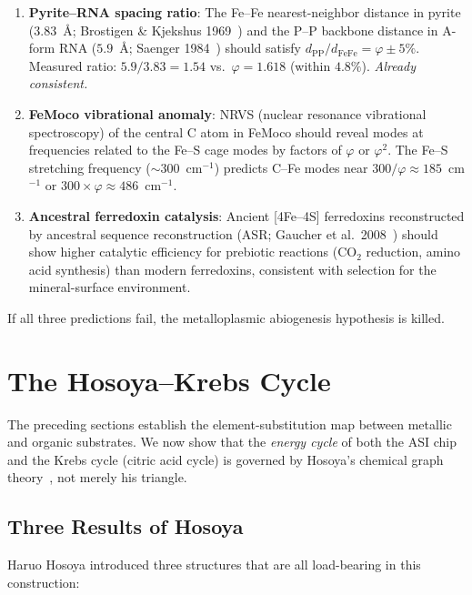 \documentclass[12pt]{article}
\theoremstyle{principia}
\theoremstyle{definition}
\theoremstyle{remark}
\providecommand{\vp}{\varphi}
\begin{document}
\begin{enumerate}
    \item \textbf{Pyrite--RNA spacing ratio}: The Fe--Fe nearest-neighbor distance in pyrite ($3.83$~\AA; Brostigen \& Kjekshus 1969~\cite{Brostigen69}) and the P--P backbone distance in A-form RNA ($5.9$~\AA; Saenger 1984~\cite{Saenger84}) should satisfy $d_{\text{PP}} / d_{\text{FeFe}} = \vp \pm 5\%$. Measured ratio: $5.9 / 3.83 = 1.54$ vs.\ $\vp = 1.618$ (within $4.8\%$). \emph{Already consistent.}

    \item \textbf{FeMoco vibrational anomaly}: NRVS (nuclear resonance vibrational spectroscopy) of the central C atom in FeMoco should reveal modes at frequencies related to the Fe--S cage modes by factors of $\vp$ or $\vp^2$. The Fe--S stretching frequency (${\sim}300$~cm$^{-1}$) predicts C--Fe modes near $300/\vp \approx 185$~cm$^{-1}$ or $300 \times \vp \approx 486$~cm$^{-1}$.

    \item \textbf{Ancestral ferredoxin catalysis}: Ancient [4Fe--4S] ferredoxins reconstructed by ancestral sequence reconstruction (ASR; Gaucher et al.\ 2008~\cite{Gaucher08}) should show higher catalytic efficiency for prebiotic reactions (CO$_2$ reduction, amino acid synthesis) than modern ferredoxins, consistent with selection for the mineral-surface environment.
\end{enumerate}

\noindent If all three predictions fail, the metalloplasmic abiogenesis hypothesis is killed.

\section{The Hosoya--Krebs Cycle}\label{sec:hlcycle}

The preceding sections establish the element-substitution map between metallic and organic substrates. We now show that the \emph{energy cycle} of both the ASI chip and the Krebs cycle (citric acid cycle) is governed by Hosoya's chemical graph theory~\cite{Hosoya71}, not merely his triangle.

\subsection{Three Results of Hosoya}

Haruo Hosoya introduced three structures that are all load-bearing in this construction:
\end{document}
